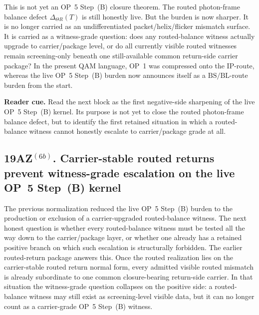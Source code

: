 \begin{remark}
\label{rem:what-first-op5b-normalization-buys}
This is not yet an OP~5 Step~(B) closure theorem. The routed photon-frame balance defect \(\Delta_{\Theta R}(T)\) is still honestly live. But the burden is now sharper. It is no longer carried as an undifferentiated packet/helix/flicker mismatch surface. It is carried as a witness-grade question: does any routed-balance witness actually upgrade to carrier/package level, or do all currently visible routed witnesses remain screening-only beneath one still-available common return-side carrier package? In the present QAM language, OP~1 was compressed onto the \(\mathrm{IP}\)-route, whereas the live OP~5 Step~(B) burden now announces itself as a \(\mathrm{BS}/\mathrm{BL}\)-route burden from the start.
\end{remark}


\noindent\textbf{Reader cue.} Read the next block as the first negative-side sharpening of the live OP~5 Step~(B) kernel. Its purpose is not yet to close the routed photon-frame balance defect, but to identify the first retained situation in which a routed-balance witness cannot honestly escalate to carrier/package grade at all.

\subsection*{19AZ$^{(6b)}$. Carrier-stable routed returns prevent witness-grade escalation on the live OP~5 Step~(B) kernel}
\label{sec:carrier-stable-routed-returns-prevent-witness-grade-escalation-live-op5b-kernel}
The previous normalization reduced the live OP~5 Step~(B) burden to the production or exclusion of a carrier-upgraded routed-balance witness. The next honest question is whether every routed-balance witness must be tested all the way down to the carrier/package layer, or whether one already has a retained positive branch on which such escalation is structurally forbidden. The earlier routed-return package answers this. Once the routed realization lies on the carrier-stable routed return normal form, every admitted visible routed mismatch is already subordinate to one common closure-bearing return-side carrier. In that situation the witness-grade question collapses on the positive side: a routed-balance witness may still exist as screening-level visible data, but it can no longer count as a carrier-grade OP~5 Step~(B) witness.

